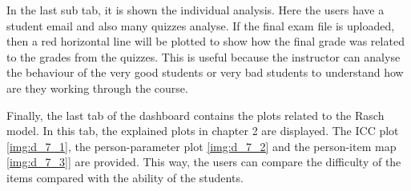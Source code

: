 \vspace{4 mm}
\vspace{2 mm}

In the last sub tab, it is shown the individual analysis. Here the users have a student email and also many quizzes analyse. If the final exam file is uploaded, then a red horizontal line will be plotted to show how the final grade was related to the grades from the quizzes. This is useful because the instructor can analyse the behaviour of the very good students or very bad students to understand how are they working through the course.

\vspace{4 mm}
\vspace{2 mm}

Finally, the last tab of the dashboard contains the plots related to the Rasch model. In this tab, the explained plots in chapter 2 are displayed. The ICC plot \cref{img:d_7_1}, the person-parameter plot \cref{img:d_7_2} and the person-item map \cref{img:d_7_3}] are provided. This way, the users can compare the difficulty of the items compared with the ability of the students.

